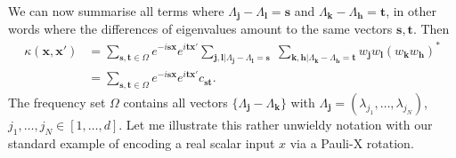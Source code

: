 \documentclass[aps, reprint, onecolumn, nofootinbib, longbibliography]{revtex4-2}
\begin{document}
We can now summarise all terms where $ \Lambda_{\mathbf{j}} - \Lambda_{\mathbf{l}} = \mathbf{s}$ and $ \Lambda_{\mathbf{k}} - \Lambda_{\mathbf{h}} = \mathbf{t}$, in other words where the differences of eigenvalues amount to the same vectors $\mathbf{s}, \mathbf{t}$. Then
\begin{align}
      \kappa (\mathbf{x}, \mathbf{x}')   &= \sum_{\mathbf{s}, \mathbf{t} \in \Omega}  e^{-i \mathbf{s} \mathbf{x} } e^{i \mathbf{t} \mathbf{x}' } \sum_{\mathbf{j}, \mathbf{l} | \Lambda_{\mathbf{j}}-\Lambda_{\mathbf{l}} = \mathbf{s} } \; 
      \sum_{\mathbf{k}, \mathbf{h} | \Lambda_{\mathbf{k}}-\Lambda_{\mathbf{h}} = \mathbf{t} } w_{\mathbf{j}}w_{\mathbf{l}} (w_{\mathbf{k}}w_{\mathbf{h}})^*\\
      &= \sum_{\mathbf{s}, \mathbf{t} \in \Omega}  e^{-i \mathbf{s} \mathbf{x} } e^{i \mathbf{t} \mathbf{x}' }c_{\mathbf{st}}.
\end{align}
The frequency set $\Omega$ contains all vectors $\{ \Lambda_{\mathbf{j}} - \Lambda_{\mathbf{k}}\}$ with $\Lambda_{\mathbf{j}} = (\lambda_{j_1}, \dots , \lambda_{j_N}) $, $j_1,\dots, j_N \in [1, \dots, d] $.
Let me illustrate this rather unwieldy notation with our standard example of encoding a real scalar input $x$ via a Pauli-X rotation. 
\end{document}
